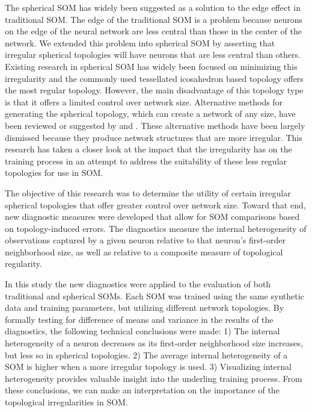 The spherical SOM has widely been suggested as a solution to the edge effect
in traditional SOM.  The edge of the traditional SOM is a problem because neurons on
the edge of the neural network are less central than those in
the center of the network.  We extended this problem into spherical SOM by
asserting that irregular spherical topologies will have neurons that are less
central than others.  Existing research in spherical SOM has widely been
focused on minimizing this irregularity and the commonly used tessellated
icosahedron based topology offers the most regular topology. However, the main
disadvantage of this topology type is that it offers a limited control over
network size.  Alternative methods for generating the spherical topology,
which can create a network of any size, have been reviewed or suggested by
\cite{wu2005} and \cite{Nishio:2006fk}.  These alternative methods have been
largely dismissed because they produce network structures that are more irregular.
This research has taken a closer look at the impact that the irregularity has on
the training process in an attempt to address the suitability of these less regular
topologies for use in SOM.

The objective of this research was to determine the utility of certain
irregular spherical topologies that offer greater control over
network size.  Toward that end, new diagnostic measures were developed that
allow for SOM comparisons based on topology-induced errors.  The diagnostics
measure the internal heterogeneity of observations captured by a given neuron
relative to that neuron's first-order neighborhood size, as well as relative
to a composite measure of topological regularity.

In this study the new diagnostics were applied to the evaluation of both
traditional and spherical SOMs. Each SOM was trained using the same synthetic
data and training parameters, but utilizing different network topologies.  By
formally testing for difference of means and variance in the results of the
diagnostics, the following technical conclusions were made: 1) The internal
heterogeneity of a neuron decreases as its first-order neighborhood size
increases, but less so in spherical topologies.  2) The average internal
heterogeneity of a SOM is higher when a more irregular topology is used.  3)
Visualizing internal heterogeneity provides valuable insight into the
underling training process. From these conclusions, we can make an
interpretation on the importance of the topological irregularities in SOM.

